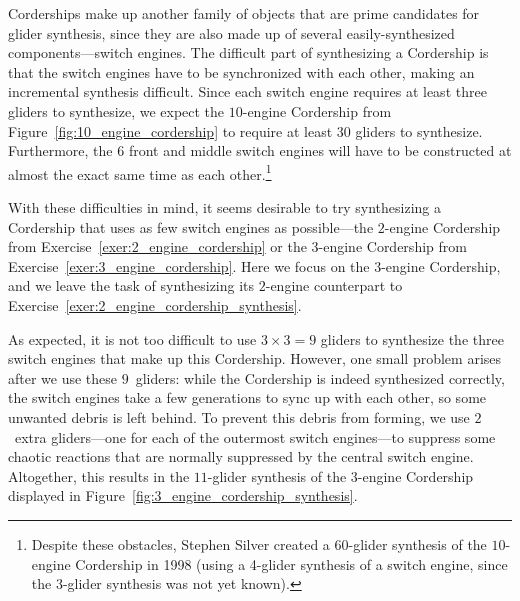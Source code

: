 Corderships make up another family of objects that are prime candidates for glider synthesis, since they are also made up of several easily-synthesized components---switch engines. The difficult part of synthesizing a Cordership is that the switch engines have to be synchronized with each other, making an incremental synthesis difficult. Since each switch engine requires at least three gliders to synthesize, we expect the $10$-engine Cordership from Figure~\ref{fig:10_engine_cordership} to require at least $30$ gliders to synthesize. Furthermore, the $6$ front and middle switch engines will have to be constructed at almost the exact same time as each other.\footnote{Despite these obstacles, Stephen Silver created a $60$-glider synthesis of the $10$-engine Cordership in 1998 (using a 4-glider synthesis of a switch engine, since the 3-glider synthesis was not yet known).}

With these difficulties in mind, it seems desirable to try synthesizing a Cordership that uses as few switch engines as possible---the $2$-engine Cordership from Exercise~\ref{exer:2_engine_cordership} or the $3$-engine Cordership from Exercise~\ref{exer:3_engine_cordership}. Here we focus on the $3$-engine Cordership, and we leave the task of synthesizing its $2$-engine counterpart to Exercise~\ref{exer:2_engine_cordership_synthesis}.

As expected, it is not too difficult to use $3 \times 3 = 9$ gliders to synthesize the three switch engines that make up this Cordership. However, one small problem arises after we use these $9$~gliders: while the Cordership is indeed synthesized correctly, the switch engines take a few generations to sync up with each other, so some unwanted debris is left behind. To prevent this debris from forming, we use $2$~extra gliders---one for each of the outermost switch engines---to suppress some chaotic reactions that are normally suppressed by the central switch engine. Altogether, this results in the $11$-glider synthesis of the $3$-engine Cordership displayed in Figure~\ref{fig:3_engine_cordership_synthesis}.

